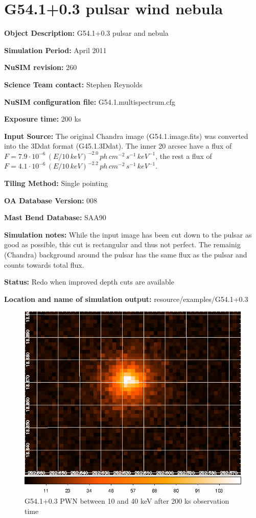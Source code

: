 
\newpage

\section{G54.1+0.3 pulsar wind nebula}

\textbf{Object Description:} G54.1+0.3 pulsar and nebula

\textbf{Simulation Period:} April 2011

\textbf{NuSIM revision:} 260

\textbf{Science Team contact:} Stephen Reynolds

\textbf{NuSIM configuration file:} G54.1.multispectrum.cfg

\textbf{Exposure time:} 200 ks

\textbf{Input Source:} 
The original Chandra image (G54.1.image.fits) was converted into the 3Ddat format (G45.1.3Ddat).
The inner 20 arcsec have a flux of $F = 7.9\cdot10^{-6}\,(E/10\,keV)^{-2.0}\,ph\,cm^{-2}\,s^{-1}\,keV^{-1}$, the rest a flux of $F = 4.1\cdot10^{-6}\,(E/10\,keV)^{-2.2}\,ph\,cm^{-2}\,s^{-1}\,keV^{-1}$.

\textbf{Tiling Method:} Single pointing

\textbf{OA Database Version:} 008

\textbf{Mast Bend Database:} SAA90

\textbf{Simulation notes:} While the input image has been cut down to the pulsar as good as possible, this cut is rectangular and thus not perfect. The remainig (Chandra) background around the pulsar has the same flux as the pulsar and counts towards total flux.

\textbf{Status:} 
Redo when improved depth cuts are available

\textbf{Location and name of simulation output:} resource/examples/G54.1+0.3

\begin{figure}[h]
\begin{center}
\includegraphics[width=12cm]{G54.1+0.3/G54.png}
\caption{G54.1+0.3 PWN between 10 and 40 keV after 200 ks observation time}
\label{Vela} 
\end{center}
\end{figure}

